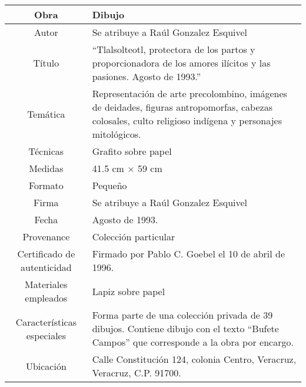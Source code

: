 \begin{table}[H]
\centering
\begin{tabular}{|c|m{}|}
\hline
Obra& Dibujo	\\
\hline
Autor & Se atribuye a Ra\'ul Gonzalez Esquivel\\
\hline
T\'itulo & ``Tlalsolteotl, protectora de los partos y proporcionadora de los amores il\'icitos y las pasiones. Agosto de 1993.''\\
\hline
Tem\'atica & Representaci\'on de arte precolombino, im\'agenes de deidades, figuras antropomorfas, cabezas colosales, culto religioso ind\'igena y personajes mitol\'ogicos.\\
\hline
T\'ecnicas &Grafito sobre papel \\
\hline
Medidas & 41.5 cm $\times$ 59 cm \\
\hline
 Formato & Peque\~no \\
 \hline
 Firma & Se atribuye a Ra\'ul Gonzalez Esquivel\\ 
 \hline
  Fecha & Agosto de 1993.\\
 \hline
 Provenance & Colecci\'on particular\\
 \hline
 Certificado de autenticidad& Firmado por Pablo C. Goebel el 10 de abril de 1996.  \\
 \hline 
  Materiales empleados & Lapiz sobre papel\\
 \hline
 Caracter\'isticas especiales & Forma parte de una colecci\'on privada de 39 dibujos. 
Contiene dibujo con el texto ``Bufete Campos'' que corresponde a la obra por encargo. \\
\hline 
Ubicaci\'on & Calle Constituci\'on 124, colonia Centro, Veracruz, Veracruz, C.P. 91700.\\
\hline

\end{tabular}
\end{table}

